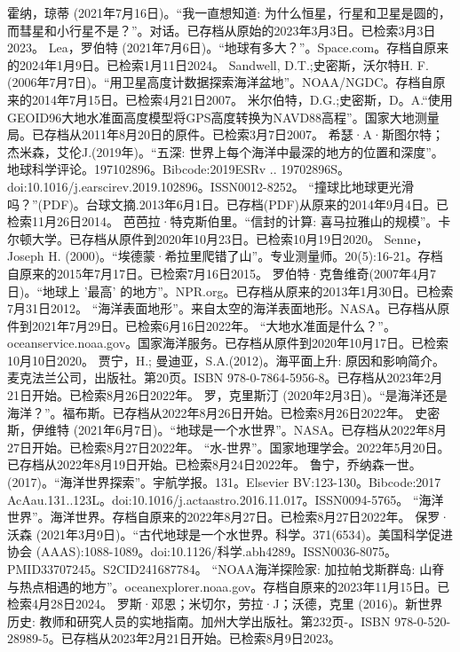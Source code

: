 \begin{enumerate}
 霍纳，琼蒂 (2021年7月16日)。“我一直想知道: 为什么恒星，行星和卫星是圆的，而彗星和小行星不是？”。对话。已存档从原始的2023年3月3日。已检索3月3日2023。
 Lea，罗伯特 (2021年7月6日)。“地球有多大？”。Space.com。存档自原来的2024年1月9日。已检索1月11日2024。
 Sandwell, D.T.;史密斯，沃尔特H. F.(2006年7月7日)。“用卫星高度计数据探索海洋盆地”。NOAA/NGDC。存档自原来的2014年7月15日。已检索4月21日2007。
 米尔伯特，D.G.;史密斯，D。A.“使用GEOID96大地水准面高度模型将GPS高度转换为NAVD88高程”。国家大地测量局。已存档从2011年8月20日的原件。已检索3月7日2007。
 希瑟·A·斯图尔特；杰米森，艾伦J.(2019年)。“五深: 世界上每个海洋中最深的地方的位置和深度”。地球科学评论。197102896。Bibcode:2019ESRv .. 19702896S。doi:10.1016/j.earscirev.2019.102896。ISSN0012-8252。 
 “撞球比地球更光滑吗？”(PDF)。台球文摘.2013年6月1日。已存档(PDF)从原来的2014年9月4日。已检索11月26日2014。
 芭芭拉·特克斯伯里。“信封的计算: 喜马拉雅山的规模”。卡尔顿大学。已存档从原件到2020年10月23日。已检索10月19日2020。
 Senne，Joseph H. (2000)。“埃德蒙·希拉里爬错了山”。专业测量师。20(5):16-21。存档自原来的2015年7月17日。已检索7月16日2015。
 罗伯特·克鲁维奇(2007年4月7日)。“地球上 '最高' 的地方”。NPR.org。已存档从原来的2013年1月30日。已检索7月31日2012。
 “海洋表面地形”。来自太空的海洋表面地形。NASA。已存档从原件到2021年7月29日。已检索6月16日2022年。
 “大地水准面是什么？”。oceanservice.noaa.gov。国家海洋服务。已存档从原件到2020年10月17日。已检索10月10日2020。
 贾宁，H.; 曼迪亚，S.A.(2012)。海平面上升: 原因和影响简介。麦克法兰公司，出版社。第20页。ISBN 978-0-7864-5956-8。已存档从2023年2月21日开始。已检索8月26日2022年。
 罗，克里斯汀 (2020年2月3日)。“是海洋还是海洋？”。福布斯。已存档从2022年8月26日开始。已检索8月26日2022年。
 史密斯，伊维特 (2021年6月7日)。“地球是一个水世界”。NASA。已存档从2022年8月27日开始。已检索8月27日2022年。
 “水-世界”。国家地理学会。2022年5月20日。已存档从2022年8月19日开始。已检索8月24日2022年。
 鲁宁，乔纳森一世。(2017)。“海洋世界探索”。宇航学报。131。Elsevier BV:123-130。Bibcode:2017 AcAau.131..123L。doi:10.1016/j.actaastro.2016.11.017。ISSN0094-5765。 
 “海洋世界”。海洋世界。存档自原来的2022年8月27日。已检索8月27日2022年。
 保罗·沃森 (2021年3月9日)。“古代地球是一个水世界。科学。371(6534)。美国科学促进协会 (AAAS):1088-1089。doi:10.1126/科学.abh4289。ISSN0036-8075。PMID33707245。S2CID241687784。   
 “NOAA海洋探险家: 加拉帕戈斯群岛: 山脊与热点相遇的地方”。oceanexplorer.noaa.gov。存档自原来的2023年11月15日。已检索4月28日2024。
 罗斯·邓恩；米切尔，劳拉·J；沃德，克里 (2016)。新世界历史: 教师和研究人员的实地指南。加州大学出版社。第232页-。ISBN 978-0-520-28989-5。已存档从2023年2月21日开始。已检索8月9日2023。

\end{enumerate}
